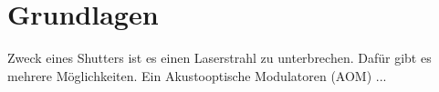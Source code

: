 \section{Grundlagen}
Zweck eines Shutters ist es einen Laserstrahl zu unterbrechen. Dafür gibt es mehrere Möglichkeiten. Ein Akustooptische Modulatoren (AOM) ...
